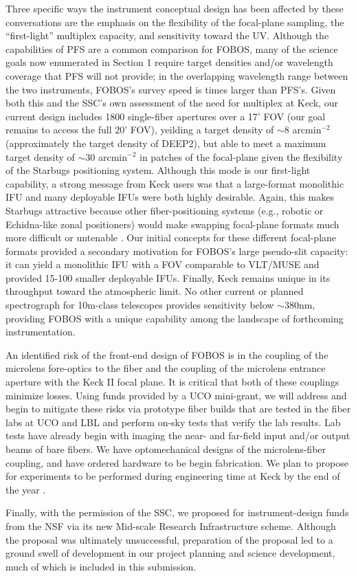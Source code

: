 Three specific ways the instrument conceptual design has been
affected by these conversations are the emphasis on the flexibility
of the focal-plane sampling, the ``first-light'' multiplex capacity,
and sensitivity toward the UV. Although the capabilities of PFS are a
common comparison for FOBOS, many of the science goals now enumerated
in Section 1 require target densities and/or wavelength coverage that
PFS will not provide; in the overlapping wavelength range between the
two instruments, FOBOS's survey speed is  times larger
than PFS's. Given both this and the SSC's own assessment of the need
for multiplex at Keck, our current design includes 1800 single-fiber
apertures over a 17' FOV (our goal remains to access the full 20'
FOV), yeilding a target density of $\sim$8 arcmin$^{-2}$
(approximately the target density of DEEP2), but able to meet a
maximum target density of $\sim$30 arcmin$^{-2}$ in patches of the
focal-plane given the flexibility of the Starbugs positioning system.
Although this mode is our first-light capability, a strong message
from Keck users was that a large-format monolithic IFU and many
deployable IFUs were both highly desirable. Again, this makes
Starbugs attractive because other fiber-positioning systems (e.g.,
robotic or Echidna-like zonal positioners) would make swapping
focal-plane formats much more difficult or untenable . Our initial concepts for these different focal-plane formats
provided a secondary motivation for FOBOS's large pseudo-slit
capacity: it can yield a monolithic IFU with a FOV comparable to
VLT/MUSE and provided 15-100 smaller deployable IFUs. Finally, Keck
remains unique in its throughput toward the atmospheric limit. No
other current or planned  spectrograph for
10m-class telescopes provides sensitivity below $\sim$380nm,
providing FOBOS with a unique capability among the landscape of
forthcoming instrumentation.

An identified risk of the front-end design of FOBOS is in the
coupling of the microlens fore-optics to the fiber and the coupling
of the microlens entrance aperture with the Keck II focal plane. It
is critical that both of these couplings minimize losses. Using funds
provided by a UCO mini-grant, we will address and begin to mitigate
these risks via prototype fiber builds that are tested in the fiber
labs at UCO and LBL  and perform on-sky tests
that verify the lab results. Lab tests have already begin with
imaging the near- and far-field input and/or output beams of bare
fibers. We have optomechanical designs of the microlens-fiber
coupling, and have ordered hardware to be begin fabrication. We plan
to propose for experiments to be performed during engineering time at
Keck by the end of the year .

Finally, with the permission of the SSC, we proposed for
instrument-design funds from the NSF via its new Mid-scale Research
Infrastructure scheme. Although the proposal was ultimately
unsuccessful, preparation of the proposal led to a ground swell of
development in our project planning and science development, much of
which is included in this submission.
